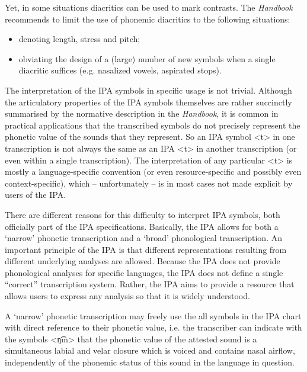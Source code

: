 \noindent Yet, in some situations diacritics can be used to mark contrasts. The
\textit{Handbook} recommends to limit the use of phonemic diacritics to the
following situations: 

\begin{itemize}

 	\item denoting length, stress and pitch;
	\item obviating the design of a (large) number of new symbols when a 
		  single diacritic suffices (e.g. nasalized vowels, aspirated stops). 
               
\end{itemize}	

The interpretation of the IPA symbols in specific usage is not trivial. Although
the articulatory properties of the IPA symbols themselves are rather succinctly
summarised by the normative description in the \textit{Handbook}, it is common
in practical applications that the transcribed symbols do not precisely
represent the phonetic value of the sounds that they represent. So an IPA symbol
<t> in one transcription is not always the same as an IPA <t> in another
transcription (or even within a single transcription). The interpretation of any
particular <t> is mostly a language-specific convention (or even
resource-specific and possibly even context-specific), which -- unfortunately --
is in most cases not made explicit by users of the IPA.

There are different reasons for this difficulty to interpret IPA symbols,
both officially part of the IPA specifications. Basically, the IPA allows for
both a `narrow' phonetic transcription and a `broad' phonological transcription.
An important principle of the IPA is that different representations resulting
from different underlying analyses are allowed. Because the IPA does not provide
phonological analyses for specific languages, the IPA does not define a single
``correct'' transcription system. Rather, the IPA aims to provide a resource
that allows users to express any analysis so that it is widely understood.

A `narrow' phonetic transcription may freely use the all symbols in the IPA
chart with direct reference to their phonetic value, i.e. the transcriber can
indicate with the symbols <ŋ͡m> that the phonetic value of the attested sound is
a simultaneous labial and velar closure which is voiced and contains nasal
airflow, independently of the phonemic status of this sound in the language in
question. 

